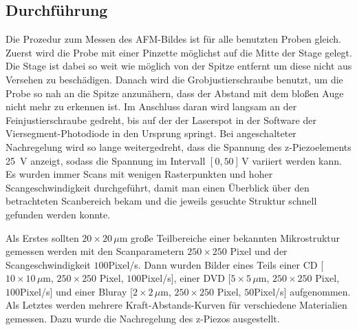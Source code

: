\subsection{Durchführung}
\label{sec:Durchfuehrung}
    Die Prozedur zum Messen des AFM-Bildes ist für alle benutzten Proben gleich.
    Zuerst wird die Probe mit einer Pinzette möglichst auf die Mitte der Stage gelegt.
    Die Stage ist dabei so weit wie möglich von der Spitze entfernt um diese nicht aus Versehen zu beschädigen.
    Danach wird die Grobjustierschraube benutzt, um die Probe so nah an die Spitze anzunähern, dass der Abstand mit dem bloßen Auge nicht mehr zu erkennen ist.
    Im Anschluss daran wird langsam an der Feinjustierschraube gedreht, bis auf der der Laserspot in der Software der Viersegment-Photodiode in den Ursprung springt.
    Bei angeschalteter Nachregelung wird so lange weitergedreht, dass die Spannung des z-Piezoelements \SI{25}{V} anzeigt, sodass die Spannung im Intervall $[0,50]\,$V variiert werden kann.
    Es wurden immer Scans mit wenigen Rasterpunkten und hoher Scangeschwindigkeit durchgeführt, damit man einen Überblick über den betrachteten Scanbereich bekam und die jeweils gesuchte Struktur schnell gefunden werden konnte.

    Als Erstes sollten $20 \times 20\, \mu$m große Teilbereiche einer bekannten Mikrostruktur gemessen werden mit den Scanparametern $250 \times 250$ Pixel und der Scangeschwindigkeit $100$Pixel/s.
    Dann wurden Bilder eines Teils einer CD [$10 \times 10\, \mu$m, $250 \times 250$ Pixel, $100$Pixel/s], einer DVD [$5 \times 5\, \mu$m, $250 \times 250$ Pixel, $100$Pixel/s] und einer Bluray [$2 \times 2\, \mu$m, $250 \times 250$ Pixel, $50$Pixel/s] aufgenommen.
    Als Letztes werden mehrere Kraft-Abstands-Kurven für verschiedene Materialien gemessen.
    Dazu wurde die Nachregelung des z-Piezos ausgestellt.